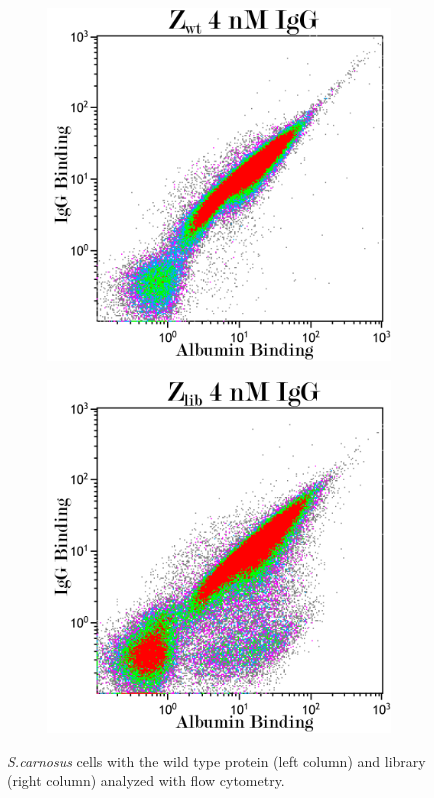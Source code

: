 \documentclass{article}
\begin{document}
\begin{multicols}{2}
\begin{figure}[H]
		\begin{subfigure}{0.45\linewidth}
			\includegraphics[width=\linewidth]{images/flow_4_wt.png}
			\label{flow_31}
		\end{subfigure}
		\begin{subfigure}{0.45\linewidth}
			\includegraphics[width=\linewidth]{images/flow_4_lib.png}
			\label{flow_32}
		\end{subfigure}
	\caption{\textit{S.carnosus} cells with the wild type protein (left column) and library (right column) analyzed with flow cytometry.}
	\label{flow}
	\end{figure}
	

\end{multicols}
\end{document}
